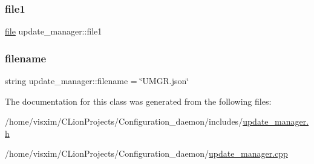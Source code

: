 \subsubsection{\texorpdfstring{file1}{file1}}
{\footnotesize\ttfamily \hyperlink{classfile}{file} update\+\_\+manager\+::file1}

\mbox{\label{classupdate__manager_a33846f6785525471da67ebfcbf36b5e6}} 
\subsubsection{\texorpdfstring{filename}{filename}}
{\footnotesize\ttfamily string update\+\_\+manager\+::filename = \char`\"{}U\+M\+G\+R.\+json\char`\"{}\hspace{0.3cm}{\ttfamily [private]}}



The documentation for this class was generated from the following files\+:\begin{DoxyCompactItemize}
\item 
/home/visxim/\+C\+Lion\+Projects/\+Configuration\+\_\+daemon/includes/\hyperlink{update__manager_8h}{update\+\_\+manager.\+h}\item 
/home/visxim/\+C\+Lion\+Projects/\+Configuration\+\_\+daemon/\hyperlink{update__manager_8cpp}{update\+\_\+manager.\+cpp}\end{DoxyCompactItemize}
